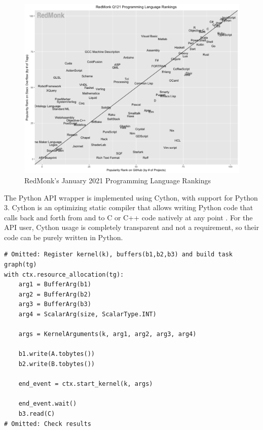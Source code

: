 \begin{figure}[H]
    \centering
    \includegraphics[width=\textwidth]{img/redmonk-ranks.png}
    \captionsetup{justification=centering}
    \caption{RedMonk's January 2021 Programming Language Rankings}
    \label{fig:redmonk-ranks}
\end{figure}

The Python API wrapper is implemented using Cython, with support for Python 3. Cython is an optimizing static compiler that allows writing Python code that calls back and forth from and to C or C++ code natively at any point \cite{cython}.
For the API user, Cython usage is completely transparent and not a requirement, so their code can be purely written in Python. 

\begin{lstlisting}[style=PythonStyle, caption=Python API Example snippet]
# Omitted: Register kernel(k), buffers(b1,b2,b3) and build task graph(tg)
with ctx.resource_allocation(tg):
    arg1 = BufferArg(b1)
    arg2 = BufferArg(b2)
    arg3 = BufferArg(b3)
    arg4 = ScalarArg(size, ScalarType.INT)

    args = KernelArguments(k, arg1, arg2, arg3, arg4)

    b1.write(A.tobytes())
    b2.write(B.tobytes())

    end_event = ctx.start_kernel(k, args)

    end_event.wait()
    b3.read(C)
# Omitted: Check results
\end{lstlisting}


